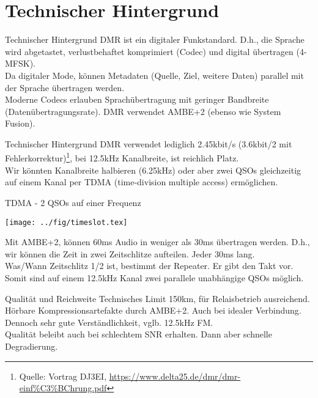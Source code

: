 \documentclass[aspectratio=169]{beamer}
\begin{document}
\section{Technischer Hintergrund}
\begin{frame}{Technischer Hintergrund}
DMR ist ein digitaler Funkstandard. D.h., die Sprache wird abgetastet, verlustbehaftet komprimiert (Codec) und digital übertragen (4-MFSK).\\[0.5cm]

Da digitaler Mode, können Metadaten (Quelle, Ziel, weitere Daten) parallel mit der Sprache übertragen werden.\\[0.5cm]

Moderne Codecs erlauben Sprachübertragung mit geringer Bandbreite (Datenübertragungsrate). DMR verwendet AMBE+2 (ebenso wie System Fusion).\\[0.5cm]
\end{frame}

\begin{frame}{Technischer Hintergrund}
DMR verwendet lediglich 2.45kbit/s (3.6kbit/2 mit Fehlerkorrektur)\footnote{Quelle: Vortrag DJ3EI, \url{https://www.delta25.de/dmr/dmr-einf\%C3\%BChrung.pdf}}, bei 12.5kHz Kanalbreite, ist reichlich Platz.\\[0.5cm]

Wir könnten Kanalbreite halbieren (6.25kHz) oder aber zwei QSOs gleichzeitig auf einem Kanal per TDMA (time-division multiple access) ermöglichen.\\[0.5cm]
\end{frame}

\begin{frame}{TDMA - 2 QSOs auf einer Frequenz}
\begin{center}
 \texttt{[image: ../fig/timeslot.tex]}
\end{center}
 Mit AMBE+2, können 60ms Audio in weniger als 30ms übertragen werden. D.h., wir können die Zeit in zwei Zeitschlitze aufteilen. Jeder 30ms lang.\\[0.5cm]
 
 Was/Wann Zeitschlitz 1/2 ist, bestimmt der Repeater. Er gibt den Takt vor. \\[0.5cm]
 
 Somit sind auf einem 12.5kHz Kanal zwei parallele unabhängige QSOs möglich.
\end{frame}

\begin{frame}{Qualität und Reichweite}
 Technisches Limit 150km, für Relaisbetrieb ausreichend.\\[0.5cm]
 
 Hörbare Kompressionsartefakte durch AMBE+2. Auch bei idealer Verbindung. Dennoch sehr gute Verständlichkeit, vglb. 12.5kHz FM. \\[0.5cm]
 
 Qualität beleibt auch bei schlechtem SNR erhalten. Dann aber schnelle Degradierung.
\end{frame}
\end{document}
